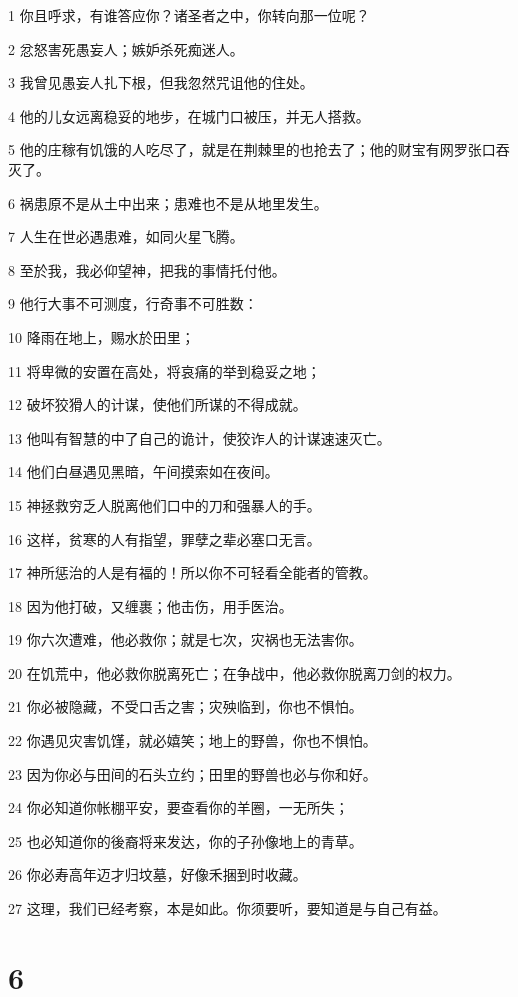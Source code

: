 \par 1 你且呼求，有谁答应你？诸圣者之中，你转向那一位呢？
\par 2 忿怒害死愚妄人；嫉妒杀死痴迷人。
\par 3 我曾见愚妄人扎下根，但我忽然咒诅他的住处。
\par 4 他的儿女远离稳妥的地步，在城门口被压，并无人搭救。
\par 5 他的庄稼有饥饿的人吃尽了，就是在荆棘里的也抢去了；他的财宝有网罗张口吞灭了。
\par 6 祸患原不是从土中出来；患难也不是从地里发生。
\par 7 人生在世必遇患难，如同火星飞腾。
\par 8 至於我，我必仰望神，把我的事情托付他。
\par 9 他行大事不可测度，行奇事不可胜数：
\par 10 降雨在地上，赐水於田里；
\par 11 将卑微的安置在高处，将哀痛的举到稳妥之地；
\par 12 破坏狡猾人的计谋，使他们所谋的不得成就。
\par 13 他叫有智慧的中了自己的诡计，使狡诈人的计谋速速灭亡。
\par 14 他们白昼遇见黑暗，午间摸索如在夜间。
\par 15 神拯救穷乏人脱离他们口中的刀和强暴人的手。
\par 16 这样，贫寒的人有指望，罪孽之辈必塞口无言。
\par 17 神所惩治的人是有福的！所以你不可轻看全能者的管教。
\par 18 因为他打破，又缠裹；他击伤，用手医治。
\par 19 你六次遭难，他必救你；就是七次，灾祸也无法害你。
\par 20 在饥荒中，他必救你脱离死亡；在争战中，他必救你脱离刀剑的权力。
\par 21 你必被隐藏，不受口舌之害；灾殃临到，你也不惧怕。
\par 22 你遇见灾害饥馑，就必嬉笑；地上的野兽，你也不惧怕。
\par 23 因为你必与田间的石头立约；田里的野兽也必与你和好。
\par 24 你必知道你帐棚平安，要查看你的羊圈，一无所失；
\par 25 也必知道你的後裔将来发达，你的子孙像地上的青草。
\par 26 你必寿高年迈才归坟墓，好像禾捆到时收藏。
\par 27 这理，我们已经考察，本是如此。你须要听，要知道是与自己有益。

\chapter{6}

